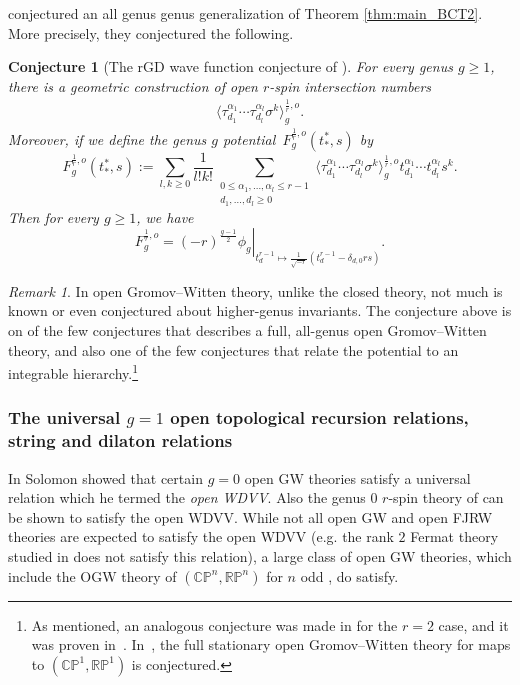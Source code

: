 \documentclass[11pt]{amsart}
\newtheorem{conj}{Conjecture}
\theoremstyle{definition}
\theoremstyle{remark}
\newtheorem{rmk}[dummy]{Remark}
\renewcommand{\d}{\ensuremath{\partial}}
\newcommand{\<}{\left<}
\renewcommand{\>}{\right>}
\numberwithin{equation}{section}
\begin{document}
\cite{BCT3} conjectured an  all genus genus generalization of Theorem \ref{thm:main_BCT2}. More precisely, they conjectured the following. 
\begin{conj}[The rGD wave function conjecture of \cite{BCT3}]\label{conj:main_conj_BCT}
For every genus $g\geq 1$, there is a geometric construction of open $r$-spin intersection numbers
\begin{gather}\label{eq:open_numbers_all_g}
\langle\tau^{\alpha_1}_{d_1}\cdots\tau^{\alpha_l}_{d_l}\sigma^k\rangle^{\frac{1}{r},o}_g.
\end{gather}
Moreover, if we define the genus $g$ potential~$F_g^{\frac{1}{r},o}(t^*_*,s)$ by
\begin{equation}\label{eq:g_pot}
F_g^{\frac{1}{r},o}(t^*_*,s):=\sum_{l,k\ge 0}\frac{1}{l!k!}\sum_{\substack{0\le\alpha_1,\ldots,\alpha_l\le r-1\\d_1,\ldots,d_l\ge 0}}\langle\tau^{\alpha_1}_{d_1}\cdots\tau^{\alpha_l}_{d_l}\sigma^k\rangle^{\frac{1}{r},o}_g t^{\alpha_1}_{d_1}\cdots t^{\alpha_l}_{d_l}s^k.
\end{equation}
Then for every $g\geq 1$, we have
\begin{equation}\label{eq:bct_conj}
F^{\frac{1}{r},o}_g=\left.(-r)^{\frac{g-1}{2}}\phi_g\right|_{t^{r-1}_d\mapsto\frac{1}{\sqrt{-r}}(t^{r-1}_d-\delta_{d,0}rs)}.
\end{equation}
\end{conj}
\begin{rmk}
In open Gromov--Witten theory, unlike the closed theory, not much is known or even conjectured about higher-genus invariants. The conjecture above is on of the few conjectures that describes a full, all-genus open Gromov--Witten theory, and also one of the few conjectures that relate the potential to an integrable hierarchy.\footnote{As mentioned, an analogous conjecture was made in \cite{PST14} for the $r=2$ case, and it was proven in~\cite{BT17}. In~\cite{BPTZ}, the full stationary open Gromov--Witten theory for maps to $(\mathbb{CP}^1,\mathbb{RP}^1)$ is conjectured.}
\end{rmk}
\subsubsection{The universal $g=1$ open topological recursion relations, string and dilaton relations}
In \cite{sol_owdvv} Solomon showed that certain $g=0$ open GW theories satisfy a universal relation which he termed the \emph{open WDVV}. Also the genus $0$ $r$-spin theory of \cite{BCT1,BCT2,BCT3} can be shown to satisfy the open WDVV. While not all open GW and open FJRW theories are expected to satisfy the open WDVV (e.g. the rank $2$ Fermat theory studied in \cite{GKT2} does not satisfy this relation), a large class of open GW theories, which include  the OGW theory of $(\mathbb{CP}^n,\mathbb{RP}^n)$ for $n$ odd \cite{solomon2023relative},  do satisfy.
\end{document}

